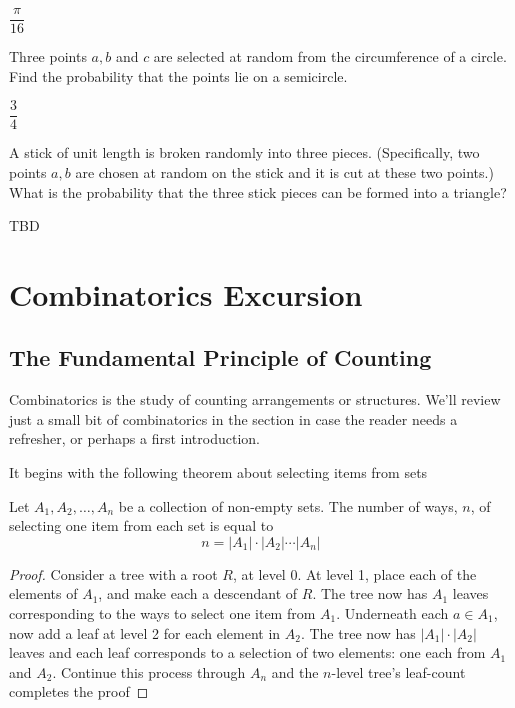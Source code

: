 \documentclass[../main.tex]{subfiles}
\begin{document}
\begin{solution}[Answer]
	$\dfrac{\pi}{16}$
\end{solution}

\begin{example}
	Three points $a,b$ and $c$ are selected at random from the circumference of a circle. Find the probability that the
	points lie on a semicircle.
\end{example}

\begin{solution}[Answer]
	$\dfrac34$
\end{solution}

\begin{example}
	A stick of unit length is broken randomly into three pieces. (Specifically, two points $a,b$ are chosen at random on the
	stick and it is cut at these two points.) What is the probability
	that the three stick pieces can be formed into a triangle?
\end{example}

\begin{solution}
	TBD
\end{solution}
\section{Combinatorics Excursion}
\subsection{The Fundamental Principle of Counting}
Combinatorics is the study of counting arrangements or structures. We'll 
review just a small bit of combinatorics in the section in case the
reader needs a refresher, or perhaps a first introduction.

It begins with the following theorem about selecting items from sets
\begin{theorem}
	Let $A_1, A_2, \ldots, A_n$ be a collection of non-empty sets. The
	number of ways, $n$, of selecting one item from each set is equal to
	$$n = |A_1| \cdot |A_2| \cdots |A_n|$$
	\label{thm:fpc}
\end{theorem}

\begin{proof}
	Consider a tree with a root $R$, at level 0. At level 1, place
	each of the elements of $A_1$, and make each a descendant of $R$. The tree
	now has $A_1$ leaves corresponding to the ways to select one item from $A_1$. 
	Underneath each $a \in A_1$, now add a leaf at level 2 for each element in $A_2$. The tree
	now has $|A_1| \cdot |A_2|$ leaves and each leaf corresponds to a selection of two elements: one each from $A_1$ and $A_2$. Continue this process through $A_n$ and
	the $n$-level tree's leaf-count completes the proof
\end{proof}
\end{document}
